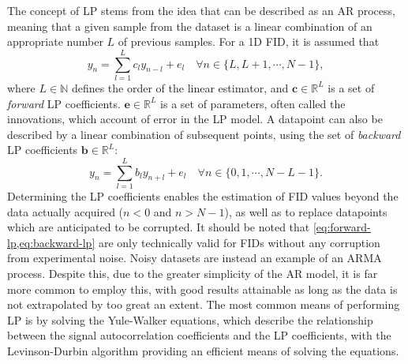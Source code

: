The concept of \ac{LP} stems from the idea that  can be described as
an \ac{AR} process, meaning that a given sample from the dataset is a linear
combination of an appropriate number $L$ of previous samples. For a \ac{1D}
\ac{FID}, it is assumed that
\begin{equation}
    y_n = \sum_{l=1}^{L}
    c_l y_{n-l} + e_l \quad
    \forall n \in \lbrace L, L + 1, \cdots, N - 1 \rbrace,
    \label{eq:forward-lp}
\end{equation}
where $L \in
\mathbb{N}$ defines the order of the linear estimator, and $\symbf{c} \in
\mathbb{R}^{L}$ is a set of \emph{forward} \ac{LP} coefficients. $\symbf{e} \in
\mathbb{R}^L$ is a set of parameters, often called the innovations,
which account of error in the \ac{LP} model. A datapoint can also be described
by a linear combination of subsequent points, using the set of \emph{backward}
\ac{LP} coefficients $\symbf{b} \in \mathbb{R}^L$:
\begin{equation}
    y_n = \sum_{l=1}^{L}
    b_l y_{n+l} + e_l \quad
    \forall n \in \lbrace 0, 1, \cdots, N - L - 1 \rbrace.
    \label{eq:backward-lp}
\end{equation}
Determining
the \ac{LP} coefficients enables the estimation of \ac{FID} values beyond the
data actually acquired ($n < 0$ and $n > N - 1$), as well as to replace
datapoints which are anticipated to be corrupted. It should be noted that
\cref{eq:forward-lp,eq:backward-lp} are only technically valid for
\acp{FID} without any corruption from experimental noise. Noisy datasets are
instead an example of an \ac{ARMA} process. Despite this, due to the greater
simplicity of the \ac{AR} model, it is far more common to employ this, with
good results attainable as long as the data is not extrapolated by too great an
extent. The most common means of performing \ac{LP} is by solving the
Yule-Walker equations\cite{Yule1927,Walker1931}, which describe the
relationship between the signal autocorrelation coefficients and the \ac{LP}
coefficients\cite[Section 3.3]{Koehl1999}, with the Levinson-Durbin algorithm
providing an efficient means of solving the
equations\cite{Levinson1946,Durbin1960}.

